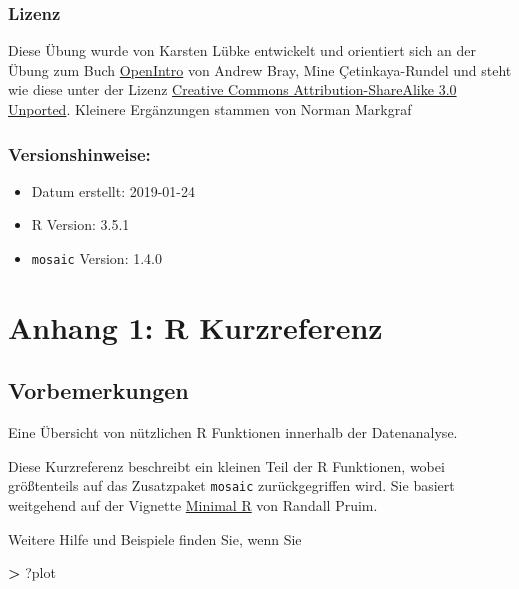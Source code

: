 \documentclass[12pt,ngerman,paper=a4,pagesize,DIV=13]{scrreprt}
\newenvironment{Shaded}{\begin{snugshade}}{\end{snugshade}}
\newcommand{\NormalTok}[1]{#1}
\newcommand{\OperatorTok}[1]{\textcolor[rgb]{0.81,0.36,0.00}{\textbf{#1}}}
\newcommand{\StringTok}[1]{\textcolor[rgb]{0.31,0.60,0.02}{#1}}
\providecommand{\tightlist}{%
  \setlength{\itemsep}{0pt}\setlength{\parskip}{0pt}}
\begin{document}
\hypertarget{lizenz-5}{%
\subsection{Lizenz}\label{lizenz-5}}

Diese Übung wurde von Karsten Lübke entwickelt und orientiert sich an
der Übung zum Buch
\href{https://www.openintro.org/stat/index.php?stat_book=isrs}{OpenIntro}
von Andrew Bray, Mine Çetinkaya-Rundel und steht wie diese unter der
Lizenz \href{http://creativecommons.org/licenses/by-sa/3.0}{Creative
Commons Attribution-ShareAlike 3.0 Unported}. Kleinere Ergänzungen
stammen von Norman Markgraf

\hypertarget{versionshinweise-5}{%
\subsection{Versionshinweise:}\label{versionshinweise-5}}

\begin{itemize}
\tightlist
\item
  Datum erstellt: 2019-01-24
\item
  R Version: 3.5.1
\item
  \texttt{mosaic} Version: 1.4.0
\end{itemize}

\newpage

\hypertarget{anhang-1-r-kurzreferenz}{%
\chapter{Anhang 1: R Kurzreferenz}\label{anhang-1-r-kurzreferenz}}

\hypertarget{vorbemerkungen}{%
\section{Vorbemerkungen}\label{vorbemerkungen}}

Eine Übersicht von nützlichen R Funktionen innerhalb der Datenanalyse.

Diese Kurzreferenz beschreibt ein kleinen Teil der R Funktionen, wobei
größtenteils auf das Zusatzpaket \texttt{mosaic} zurückgegriffen wird.
Sie basiert weitgehend auf der Vignette
\href{https://cran.r-project.org/web/packages/mosaic/vignettes/MinimalR.pdf}{Minimal
R} von Randall Pruim.

Weitere Hilfe und Beispiele finden Sie, wenn Sie

\begin{Shaded}
\begin{Highlighting}[]
\OperatorTok{>}\StringTok{ }\NormalTok{?plot}
\end{Highlighting}
\end{Shaded}
\end{document}
